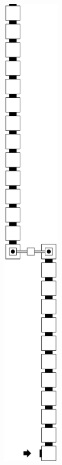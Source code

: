 \begin{itemize}
        \begin{figure}[H]
            \centering
            \begin{subfigure}[t]{0.32\textwidth}
                \centering
                \includegraphics[width=0.32\textwidth]{warping_warp_bridge_general}

\end{subfigure}
\end{figure}
\end{itemize}

